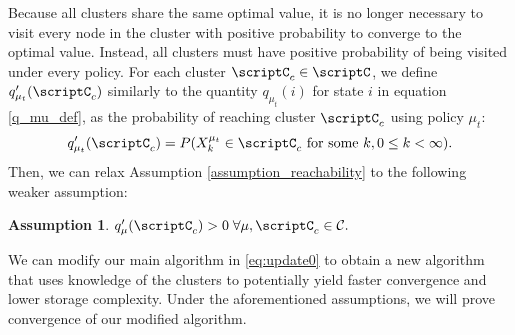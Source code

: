 \documentclass[12pt]{article}
\newtheorem{assumption}{Assumption}
\begin{document}
Because all clusters share the same optimal value, it is no longer necessary to visit every node in the cluster with positive probability to converge to the optimal value. Instead, all clusters must have positive probability of being visited under every policy. For each cluster $\scriptC_c \in \scriptC$, we define $q'_{\mu_t}(\scriptC_c )$ similarly to the quantity $q_{\mu_t}(i)$ for state $i$ in equation \eqref{q_mu_def}, as the probability of reaching cluster $\scriptC_c $ using policy $\mu_t$:
\begin{equation*}
    q'_{\mu_t}(\scriptC_c ) = P(X_k^{\mu_t} \in \scriptC_c  \text{ for some } k, 0 \leq k < \infty).
\end{equation*}
Then, we can relax Assumption \ref{assumption_reachability} to the following weaker assumption:
\begin{assumption}\label{assumption_reachability2}
    $q'_\mu(\scriptC_c ) > 0 \;\forall \mu, \scriptC_c  \in \mathcal{C}.$
\end{assumption}

We can modify our main algorithm in \eqref{eq:update0} to obtain a new algorithm that uses knowledge of the clusters to potentially yield faster convergence and lower storage complexity. Under the aforementioned assumptions, we will prove convergence of our modified algorithm.
\end{document}
